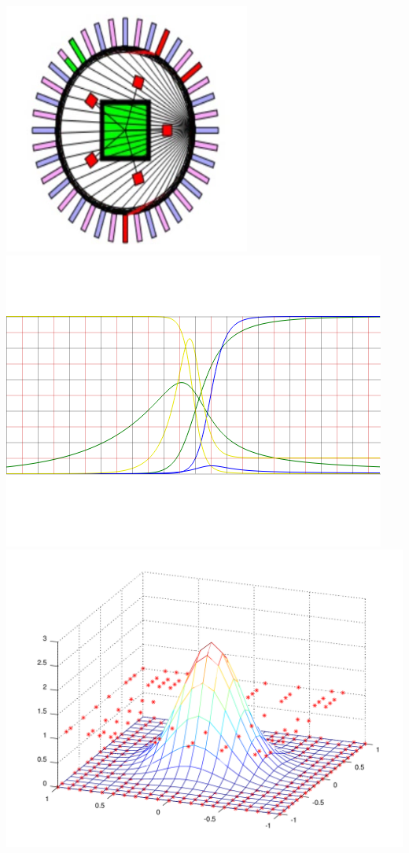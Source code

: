 \documentclass[../r.tex]{subfiles}
\begin{document}
\href{https://www.youtube.com/watch?v=mAyUxTdrQnU}{\includegraphics[scale=0.2]{../scientific/neuron_bot.png}}
\includegraphics[scale=0.15]{../scientific/nmh_inf_tau.png} 
\includegraphics[scale=0.15]{../scientific/2dconv.png} 
\end{document}
